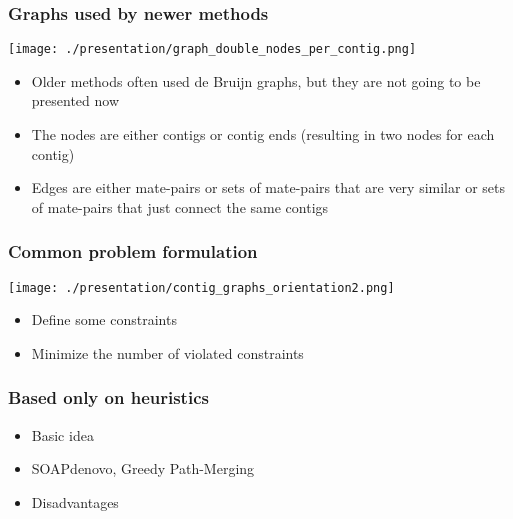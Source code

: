 \documentclass[compress]{beamer}
\begin{document}
  \begin{frame}
    \frametitle{Graphs used by newer methods}
    \begin{multicols}{2}
      \vfill
      \begin{minipage}[c][0.8\textheight][c]{\columnwidth}
        {\texttt{[image: ./presentation/graph\_double\_nodes\_per\_contig.png]}}
      \end{minipage}
      \vfill
      \columnbreak
      \begin{minipage}[c][0.8\textheight][c]{\columnwidth}
        \begin{itemize}
          \item Older methods often used de Bruijn graphs, but they are not going to
            be presented now
          \item The nodes are either contigs or contig ends (resulting in two nodes
            for each contig)
          \item Edges are either mate-pairs or sets of mate-pairs that are very
            similar or sets of mate-pairs that just connect the same contigs
        \end{itemize}
      \end{minipage}
    \end{multicols}
  \end{frame}

  \begin{frame}
    \frametitle{Common problem formulation}
    \begin{multicols}{2}
      \vfill
      \begin{minipage}[c][0.8\textheight][c]{\columnwidth}
        {\texttt{[image: ./presentation/contig\_graphs\_orientation2.png]}}
      \end{minipage}
      \vfill
      \columnbreak
      \begin{minipage}[c][0.8\textheight][c]{\columnwidth}
        \begin{itemize}
          \item Define some constraints
          \item Minimize the number of violated constraints
        \end{itemize}
      \end{minipage}
    \end{multicols}
  \end{frame}

  \begin{frame}
    \frametitle{Based only on heuristics}
    \begin{itemize}
      \item Basic idea
      \item SOAPdenovo, Greedy Path-Merging
      \item Disadvantages
    \end{itemize}
  \end{frame}
\end{document}
